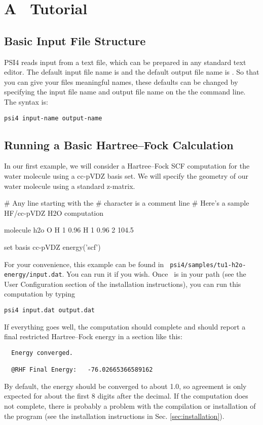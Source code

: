 \section{A \PSIfour\ Tutorial} \label{sec:tutorial}

\subsection{Basic Input File Structure} 

PSI4 reads input from a text file, which can be prepared in any standard
text editor.  The default input file name is  and the
default output file name is .  So that you can give your
files meaningful names, these defaults can be changed by specifying
the input file name and output file name on the the command line.
The syntax is:

{\tt psi4 input-name output-name}

\subsection{Running a Basic Hartree--Fock Calculation}
In our first example, we will consider a Hartree--Fock SCF computation
for the water molecule using a cc-pVDZ basis set.  We will specify the
geometry of our water molecule using a standard z-matrix.

\begin{Snippet}

# Any line starting with the # character is a comment line
# Here's a sample HF/cc-pVDZ H2O computation

molecule h2o {
  O 
  H 1 0.96
  H 1 0.96 2 104.5
}

set basis cc-pVDZ
energy('scf')
\end{Snippet}

For your convenience, this example can be found in {\tt
psi4/samples/tu1-h2o-energy/input.dat}.  You can run it if you wish.
Once \PSIfour\ is in your path (see the User Configuration section of
the installation instructions), you can run this computation by typing
\begin{verbatim}
psi4 input.dat output.dat
\end{verbatim}
If everything goes well, the computation should complete and should report
a final restricted Hartree--Fock energy in a section like this:
\begin{verbatim}
  Energy converged.

  @RHF Final Energy:   -76.02665366589162
\end{verbatim}
By default, the energy should be converged to about 1.0, so agreement
is only expected for about the first 8 digits after the decimal.  If the
computation does not complete, there is probably a problem with the
compilation or installation of the program (see the installation
instructions in Sec. \ref{sec:installation}).

